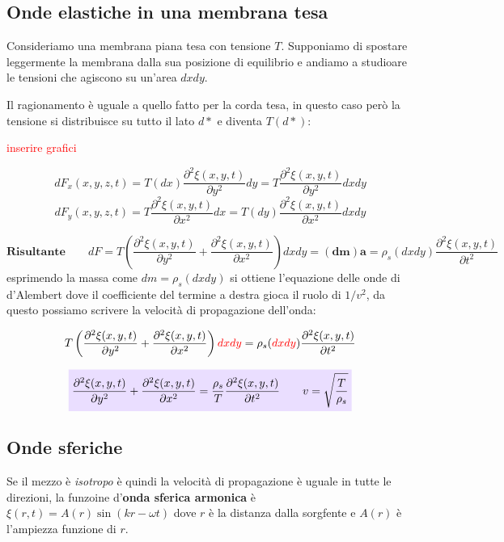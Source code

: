 \documentclass[x11names]{report}
\newcommand{\viola}[1]{\colorbox{yred}{$\displaystyle #1$}}
\begin{document}
	\subsection{Onde elastiche in una membrana tesa}
	Consideriamo una membrana piana tesa con tensione \(T\). Supponiamo di spostare leggermente la membrana dalla sua posizione di equilibrio e andiamo a studioare le tensioni che agiscono su un'area \(dxdy\). 
	
	Il ragionamento è uguale a quello fatto per la corda tesa, in questo caso però la tensione si distribuisce su tutto il lato \(d*\) e diventa \(T(d*)\):
	
	\begin{center}
		\textcolor{red}{inserire grafici}
	\end{center}
	
	\[ 
	dF_x(x,y,z,t) = T(dx)\frac{\partial^2 \xi(x,y,t)}{\partial y^2}dy = T\frac{\partial^2\xi(x,y,t)}{\partial y^2}dxdy
	\]
	\[ 
	dF_y(x,y,z,t) = T\frac{\partial^2 \xi(x,y,t)}{\partial x^2}dx = T(dy)\frac{\partial^2\xi(x,y,t)}{\partial x^2}dxdy 
	\]
	
	\[ 
	\textbf{Risultante} \qquad	dF = T\left(\frac{\partial^2\xi(x,y,t)}{\partial y^2} + \frac{\partial^2\xi(x,y,t)}{\partial x^2}\right)dxdy \mathbf{=(dm)a = }  \rho_s(dxdy)\frac{\partial^2\xi(x,y,t)}{\partial t^2}
	\]
	esprimendo la massa come \(dm = \rho_s (dxdy)\) si ottiene l'equazione delle onde di d'Alembert dove il coefficiente del termine a destra gioca il ruolo di \(1/v^2\), da questo possiamo scrivere la velocità di propagazione dell'onda:
	
	\[ 
	T\left(\frac{\partial^2\xi(x,y,t)}{\partial y^2} + \frac{\partial^2\xi(x,y,t)}{\partial x^2}\right)\textcolor{red}{dxdy} = \rho_s(\textcolor{red}{dxdy})\frac{\partial^2\xi(x,y,t)}{\partial t^2}
	\]
	
	
	\begin{equation}
		\viola{\frac{\partial^2\xi(x,y,t)}{\partial y^2} + \frac{\partial^2\xi(x,y,t)}{\partial x^2} = \frac{\rho_s}{T}\frac{\partial^2\xi(x,y,t)}{\partial t^2} \qquad v = \sqrt{\frac{T}{\rho_s}}}
	\end{equation}
	
	
	
	
	\subsection{Onde sferiche}
	Se il mezzo è \textit{isotropo} è quindi la velocità di propagazione è uguale in tutte le direzioni, la funzoine d'\textbf{onda sferica armonica} è \(\xi(r,t) = A(r)\sin\left(kr -\omega t\right)\) dove \(r\) è la distanza dalla sorgfente e \(A(r)\) è l'ampiezza funzione di \(r\). \\
	
\end{document}
